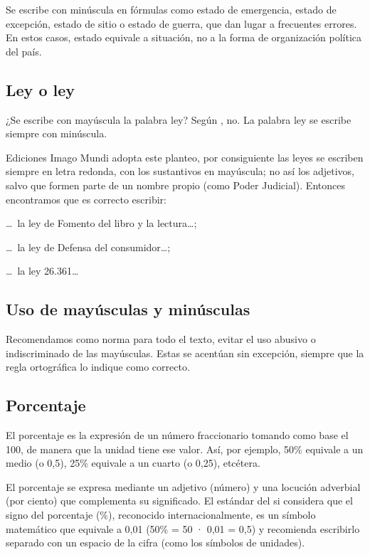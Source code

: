 \documentclass{book}
\begin{document}
{{{{{{{{Se escribe con minúscula en fórmulas como estado de emergencia, estado de excepción, estado de sitio o estado de guerra, que dan lugar a frecuentes errores. En estos casos, estado equivale a situación, no a la forma de organización política del país.

\subsection{Ley o ley}

¿Se escribe con mayúscula la palabra ley? Según \textcite{MartinezDeSousa2007}, no. La palabra ley se escribe siempre con minúscula.

Ediciones Imago Mundi adopta este planteo, por consiguiente las leyes se escriben siempre en letra redonda, con los sustantivos en mayúscula; no así los adjetivos, salvo que formen parte de un nombre propio (como Poder Judicial). Entonces encontramos que es correcto escribir:

\begin{mdframed}[linewidth=.5pt,linecolor=black!30,roundcorner=3pt,backgroundcolor=yellow!15]
\begin{compactitem}
\item \dots \ la ley de Fomento del libro y la lectura\dots;
\item \dots \ la ley de Defensa del consumidor\dots;
\item \dots \ la ley 26.361\dots
\end{compactitem}
\end{mdframed}

\subsection{Uso de mayúsculas y minúsculas}

Recomendamos como norma para todo el texto, evitar el uso abusivo o indiscriminado de las mayúsculas. Estas se acentúan sin excepción, siempre que la regla ortográfica lo indique como correcto.

\subsection{Porcentaje}

El porcentaje es la expresión de un número fraccionario tomando como base el 100, de manera que la unidad tiene ese valor. Así, por ejemplo, 50\% equivale a un medio (o 0,5), 25\% equivale a un cuarto (o 0,25), etcétera.

El porcentaje se expresa mediante un adjetivo (número) y una locución adverbial (por ciento) que complementa su significado. El estándar del \gls{si} considera que el signo del porcentaje (\%), reconocido internacionalmente, es un símbolo matemático que equivale a 0,01 (50\% = 50 · 0,01 = 0,5) y recomienda escribirlo separado con un espacio de la cifra (como los símbolos de unidades).

}}}}}}}}
\end{document}
